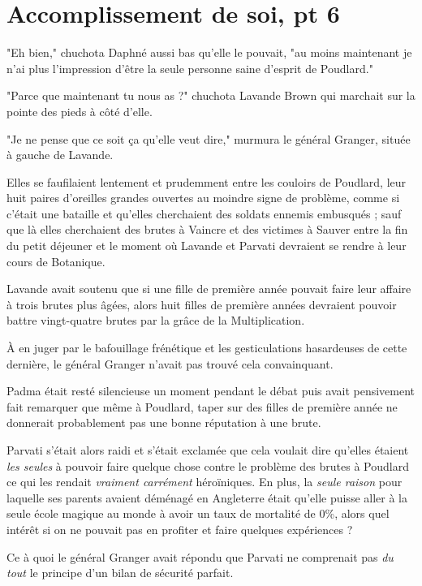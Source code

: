 
\chapter{Accomplissement de soi, pt 6}

"Eh bien," chuchota Daphné aussi bas qu'elle le pouvait, "au moins maintenant je n'ai plus l'impression d'être la seule personne saine d'esprit de Poudlard."

"Parce que maintenant tu nous as ?" chuchota Lavande Brown qui marchait sur la pointe des pieds à côté d'elle.

"Je ne pense que ce soit ça qu'elle veut dire," murmura le général Granger, située à gauche de Lavande.

Elles se faufilaient lentement et prudemment entre les couloirs de Poudlard, leur huit paires d'oreilles grandes ouvertes au moindre signe de problème, comme si c'était une bataille et qu'elles cherchaient des soldats ennemis embusqués ; sauf que là elles cherchaient des brutes à Vaincre et des victimes à Sauver entre la fin du petit déjeuner et le moment où Lavande et Parvati devraient se rendre à leur cours de Botanique.

Lavande avait soutenu que si une fille de première année pouvait faire leur affaire à trois brutes plus âgées, alors huit filles de première années devraient pouvoir battre vingt-quatre brutes par la grâce de la Multiplication.

À en juger par le bafouillage frénétique et les gesticulations hasardeuses de cette dernière, le général Granger n'avait pas trouvé cela convainquant.

Padma était resté silencieuse un moment pendant le débat puis avait pensivement fait remarquer que même à Poudlard, taper sur des filles de première année ne donnerait probablement pas une bonne réputation à une brute.

Parvati s'était alors raidi et s'était exclamée que cela voulait dire qu'elles étaient \emph{les seules}  à pouvoir faire quelque chose contre le problème des brutes à Poudlard ce qui les rendait \emph{vraiment carrément}  héroïniques. En plus, la \emph{seule raison}  pour laquelle ses parents avaient déménagé en Angleterre était qu'elle puisse aller à la seule école magique au monde à avoir un taux de mortalité de 0\%, alors quel intérêt si on ne pouvait pas en profiter et faire quelques expériences ?

Ce à quoi le général Granger avait répondu que Parvati ne comprenait pas \emph{du tout}  le principe d'un bilan de sécurité parfait.

